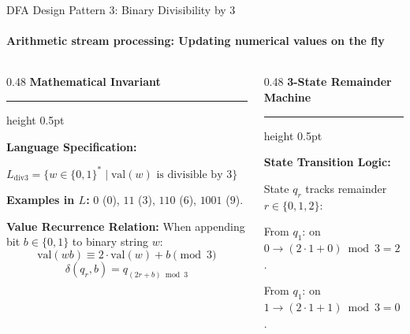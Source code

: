 \documentclass[aspectratio=169, 10pt]{beamer}
\newcommand{\colheader}[1]{%
  {\noindent\footnotesize\bfseries\color{gimpanavy}#1}%
  \vspace{0.02cm}%
  {\color{gimpanavy!30}\hrule height 0.5pt}%
  \vspace{0.05cm}%
}
\newcommand{\cardtitle}[1]{{\noindent\footnotesize\bfseries\color{gimpanavy}#1}\par\vspace{0.03cm}}
\newcommand{\greentitle}[1]{{\noindent\footnotesize\bfseries\color{accentGreen}#1}\par\vspace{0.03cm}}
\begin{document}
\begin{frame}{DFA Design Pattern 3: Binary Divisibility by 3}
  \framesubtitle{Arithmetic stream processing: Updating numerical values on the fly}
  
  \begin{columns}[T]
    \begin{column}{0.48\textwidth}
      \colheader{Mathematical Invariant}
      \begin{tcolorbox}[conceptcard]
        \cardtitle{Language Specification:}
        {\scriptsize
        $L_{\text{div3}} = \{w \in \{0, 1\}^* \mid \text{val}(w) \text{ is divisible by } 3\}$\par
        \textbf{Examples in $L$:} $0$ ($0$), $11$ ($3$), $110$ ($6$), $1001$ ($9$).
        \vspace{0.06cm}
        
        \textbf{Value Recurrence Relation:}
        When appending bit $b \in \{0, 1\}$ to binary string $w$:
        \[ \text{val}(wb) \equiv 2 \cdot \text{val}(w) + b \pmod 3 \]
        \[ \delta(q_r, b) = q_{(2r + b) \bmod 3} \]
        }
      \end{tcolorbox}
    \end{column}
    
    \begin{column}{0.48\textwidth}
      \colheader{3-State Remainder Machine}
      \begin{center}
      \end{center}
      \begin{tcolorbox}[examplecard]
        \greentitle{State Transition Logic:}
        {\scriptsize
        State $q_r$ tracks remainder $r \in \{0, 1, 2\}$:\par
        From $q_1$: on $0 \to (2\cdot 1+0)\bmod 3 = 2 \implies q_2$.\par
        From $q_1$: on $1 \to (2\cdot 1+1)\bmod 3 = 0 \implies q_0$.
        }
      \end{tcolorbox}
    \end{column}
  \end{columns}
\end{frame}
\end{document}
